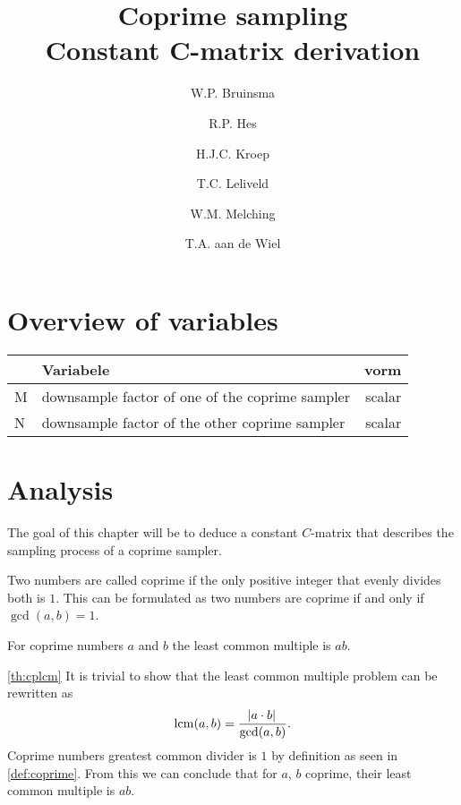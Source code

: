 \documentclass[a4paper, openany, oneside]{memoir}
\title{Coprime sampling\\Constant C-matrix derivation}
\author{W.P. Bruinsma \and R.P. Hes \and H.J.C. Kroep \and T.C. Leliveld \and W.M. Melching \and T.A. aan de Wiel}
\begin{document}
\begin{titlingpage}
  \pagestyle{empty}
  \maketitle
\end{titlingpage}
\chapter{Overview of variables}
\begin{center}
    \begin{tabular}{llr}
        \toprule
         & Variabele & vorm \\
        \midrule
        M & downsample factor of one of the coprime sampler & scalar \\
        N & downsample factor of the other coprime sampler & scalar \\
        \bottomrule
    \end{tabular}
\end{center}

\chapter{Analysis}
The goal of this chapter will be to deduce a constant $C$-matrix that describes the sampling process of a coprime sampler.

\begin{blockDefinition}
\label{def:coprime}
    Two numbers are called coprime if the only positive integer that evenly divides both is $1$. This can be formulated as two numbers are coprime if and only if $\gcd(a,b) = 1$.
\end{blockDefinition}

\begin{blockTheorem}\label{th:cplcm}
    For coprime numbers $a$ and $b$ the least common multiple is $ab$.
\end{blockTheorem}

\begin{blockProofTheorem}{\ref{th:cplcm}}
    It is trivial to show that the least common multiple problem can be rewritten as \begin{equation*}
        \operatorname{lcm}(a,b) = \frac{\abs{a \cdot b}}{\gcd(a,b)}.
    \end{equation*}
    Coprime numbers greatest common divider is $1$ by definition as seen in \cref{def:coprime}. From this we can conclude that for $a$, $b$ coprime, their least common multiple is $ab$.
\end{blockProofTheorem}
\end{document}
